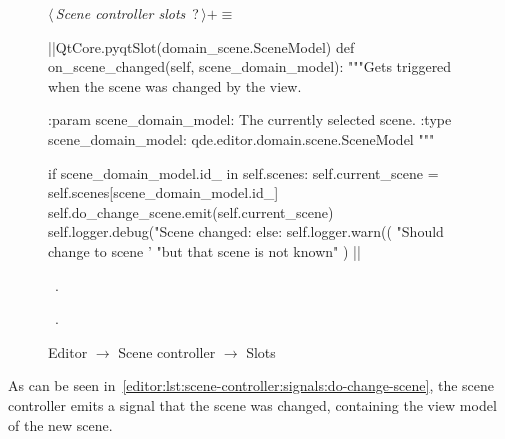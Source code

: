 \documentclass[%
    a4paper,    %
    justified,  %
    nobib,      %
    openany     %
]{tufte-book}
\begin{document}
\begin{figure}
\begin{flushleft} \small
\begin{minipage}{\linewidth}\label{scrap95}\raggedright\small
{} $\langle\,${\itshape Scene controller slots}\nobreak\ {\footnotesize {?}}$\,\rangle+\equiv$
\vspace{-1ex}
\begin{pythoncode}
|\normalfont{}\fontfamily{}|QtCore.pyqtSlot(domain_scene.SceneModel)
def on_scene_changed(self, scene_domain_model):
    """Gets triggered when the scene was changed by the view.

    :param scene_domain_model: The currently selected scene.
    :type  scene_domain_model: qde.editor.domain.scene.SceneModel
    """

    if scene_domain_model.id_ in self.scenes:
        self.current_scene = self.scenes[scene_domain_model.id_]
        self.do_change_scene.emit(self.current_scene)
        self.logger.debug("Scene changed: %
    else:
        self.logger.warn((
            "Should change to scene '%
            "but that scene is not known"
        ) %
|\NWsep|
\end{pythoncode}
\vspace{1.5ex}
\footnotesize
\begin{list}{}{\setlength{\itemsep}{-\parsep}\setlength{\itemindent}{-\leftmargin}}
\item \NWtxtMacroDefBy\ .
\item \NWtxtMacroRefIn\ .

\item{}
\end{list}
\end{minipage}\vspace{4ex}
\end{flushleft}
\caption{
  \newline{}\newline{}Editor $\rightarrow$ Scene controller $\rightarrow$
  Slots}
\label{editor:lst:scene-controller:signals:do-change-scene}
\end{figure}

As can be seen in~\autoref{editor:lst:scene-controller:signals:do-change-scene},
the scene controller emits a signal that the scene was changed, containing the
view model of the new scene.
\end{document}
